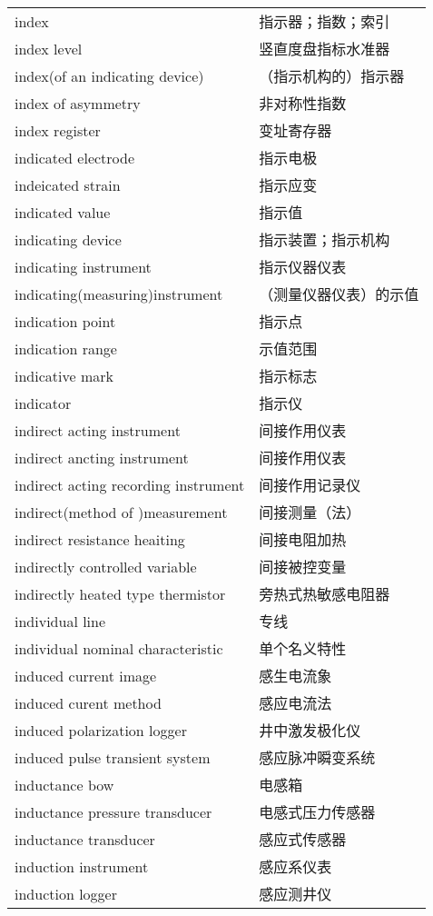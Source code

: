 \documentclass[
]{article}
\begin{document}
\begin{longtable}[]{@{}ll@{}}
index & 指示器；指数；索引 \\
index level & 竖直度盘指标水准器 \\
index(of an indicating device) & （指示机构的）指示器 \\
index of asymmetry & 非对称性指数 \\
index register & 变址寄存器 \\
indicated electrode & 指示电极 \\
indeicated strain & 指示应变 \\
indicated value & 指示值 \\
indicating device & 指示装置；指示机构 \\
indicating instrument & 指示仪器仪表 \\
indicating(measuring)instrument & （测量仪器仪表）的示值 \\
indication point & 指示点 \\
indication range & 示值范围 \\
indicative mark & 指示标志 \\
indicator & 指示仪 \\
indirect acting instrument & 间接作用仪表 \\
indirect ancting instrument & 间接作用仪表 \\
indirect acting recording instrument & 间接作用记录仪 \\
indirect(method of )measurement & 间接测量（法） \\
indirect resistance heaiting & 间接电阻加热 \\
indirectly controlled variable & 间接被控变量 \\
indirectly heated type thermistor & 旁热式热敏感电阻器 \\
individual line & 专线 \\
individual nominal characteristic & 单个名义特性 \\
induced current image & 感生电流象 \\
induced curent method & 感应电流法 \\
induced polarization logger & 井中激发极化仪 \\
induced pulse transient system & 感应脉冲瞬变系统 \\
inductance bow & 电感箱 \\
inductance pressure transducer & 电感式压力传感器 \\
inductance transducer & 感应式传感器 \\
induction instrument & 感应系仪表 \\
induction logger & 感应测井仪 \\

\end{longtable}
\end{document}
